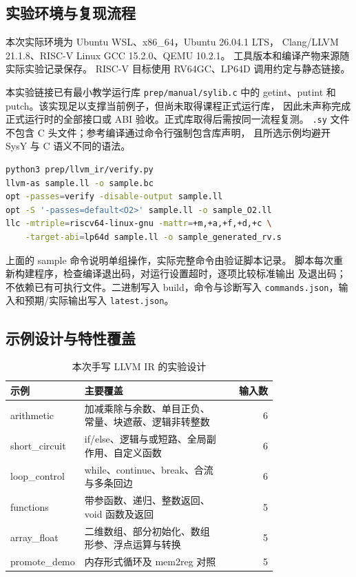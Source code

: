 \documentclass[UTF8,a4paper,11pt]{ctexart}
\begin{document}
\subsection{实验环境与复现流程}
本次实际环境为 Ubuntu WSL、x86\_64，Ubuntu 26.04.1 LTS，
Clang/LLVM 21.1.8、RISC-V Linux GCC 15.2.0、QEMU 10.2.1。
工具版本和编译产物来源随实际实验记录保存。
RISC-V 目标使用 RV64GC、LP64D 调用约定与静态链接。

本实验链接已有最小教学运行库 \texttt{prep/manual/sylib.c} 中的
getint、putint 和 putch。该实现足以支撑当前例子，但尚未取得课程正式运行库，
因此未声称完成正式运行时的全部接口或 ABI 验收。正式库取得后需按同一流程复测。
\texttt{.sy} 文件不包含 C 头文件；参考编译通过命令行强制包含库声明，
且所选示例均避开 SysY 与 C 语义不同的语法。

\par\vspace{0.7\baselineskip}\noindent\begin{minipage}[t]{\linewidth}
\begin{lstlisting}[language=bash]
python3 prep/llvm_ir/verify.py
llvm-as sample.ll -o sample.bc
opt -passes=verify -disable-output sample.ll
opt -S '-passes=default<O2>' sample.ll -o sample_O2.ll
llc -mtriple=riscv64-linux-gnu -mattr=+m,+a,+f,+d,+c \
    -target-abi=lp64d sample.ll -o sample_generated_rv.s
\end{lstlisting}
\end{minipage}\par\vspace{0.5\baselineskip}
上面的 sample 命令说明单组操作，实际完整命令由验证脚本记录。
脚本每次重新构建程序，检查编译退出码，对运行设置超时，逐项比较标准输出
及退出码；不依赖已有可执行文件。二进制写入 build，命令与诊断写入
\texttt{commands.json}，输入和预期/实际输出写入 \texttt{latest.json}。

\subsection{示例设计与特性覆盖}
\begin{table}[htbp]
\centering\small
\begin{tabular}{p{0.23\linewidth}p{0.54\linewidth}r}
\toprule
示例 & 主要覆盖 & 输入数\\
\midrule
arithmetic & 加减乘除与余数、单目正负、常量、块遮蔽、逻辑非转整数 & 6\\
short\_circuit & if/else、逻辑与或短路、全局副作用、自定义函数 & 6\\
loop\_control & while、continue、break、合流与多条回边 & 6\\
functions & 带参函数、递归、整数返回、void 函数及返回 & 5\\
array\_float & 二维数组、部分初始化、数组形参、浮点运算与转换 & 5\\
promote\_demo & 内存形式循环及 mem2reg 对照 & 5\\
\bottomrule
\end{tabular}
\caption{本次手写 LLVM IR 的实验设计}
\end{table}
\end{document}
